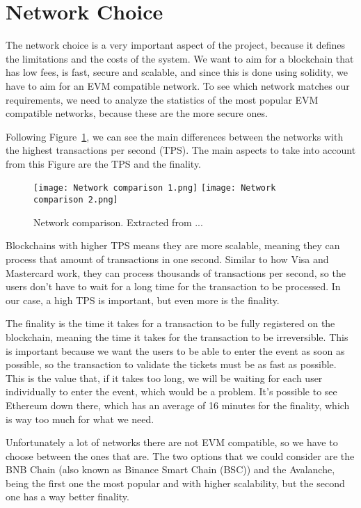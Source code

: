 \section{Network Choice}
\label{sec:network_choice}

The network choice is a very important aspect of the project, because it
defines the limitations and the costs of the system. We want to aim for a
blockchain that has low fees, is fast, secure and scalable, and since this is
done using solidity, we have to aim for an EVM compatible network. To see which
network matches our requirements, we need to analyze the statistics of the most
popular EVM compatible networks, because these are the more secure ones.

Following Figure~\ref{fig:network_comparison}, we can see the main differences
between the networks with the highest transactions per second (TPS). The main
aspects to take into account from this Figure are the TPS and the finality.

\begin{figure}[H]
    \texttt{[image: Network comparison 1.png]}
    \texttt{[image: Network comparison 2.png]}
    \centering
    \caption{Network comparison. Extracted from ...}
    \label{fig:network_comparison}
\end{figure}

Blockchains with higher TPS means they are more scalable, meaning they can
process that amount of transactions in one second. Similar to how Visa and
Mastercard work, they can process thousands of transactions per second, so the
users don't have to wait for a long time for the transaction to be processed.
In our case, a high TPS is important, but even more is the finality.

The finality is the time it takes for a transaction to be fully registered on
the blockchain, meaning the time it takes for the transaction to be
irreversible. This is important because we want the users to be able to enter
the event as soon as possible, so the transaction to validate the tickets must
be as fast as possible. This is the value that, if it takes too long, we will
be waiting for each user individually to enter the event, which would be a
problem. It's possible to see Ethereum down there, which has an average of 16
minutes for the finality, which is way too much for what we need.

Unfortunately a lot of networks there are not EVM compatible, so we have to
choose between the ones that are. The two options that we could consider are
the BNB Chain (also known as Binance Smart Chain (BSC)) and the Avalanche,
being the first one the most popular and with higher scalability, but the
second one has a way better finality.

